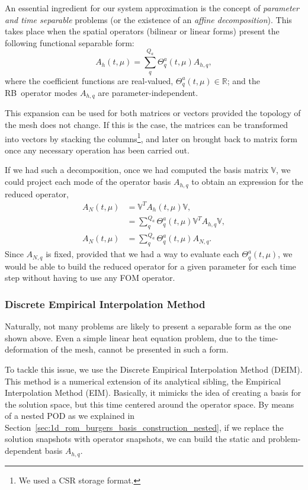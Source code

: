 \documentclass[../../thesis.tex]{subfiles}
\newcommand{\rbV}{\ensuremath{\mathbb{V}}}
\newcommand{\rbVT}{\ensuremath{\rbV^T}}
\begin{document}
An essential ingredient for our system approximation is the concept of \emph{parameter and time separable} problems 
(or the existence of an \emph{affine decomposition}).
This takes place when the spatial operators (bilinear or linear forms)
present the following functional separable form:
\begin{equation}
    \label{eq:1d_rom_burgers_separable_form_time_param}
    A_h(t, \mu) = \sum_q^{Q_a} \Theta_q^a(t, \mu) A_{h,q},
\end{equation}
where the coefficient functions are real-valued, \mbox{$\Theta_q^a(t, \mu) \in \mathbb{R}$};
and the RB operator modes $A_{h,q}$ are parameter-independent.

This expansion can be used for both matrices or vectors provided 
the topology of the mesh does not change.
If this is the case, the matrices can be transformed into vectors
by stacking the columns\footnote{We used a CSR storage format.}, 
and later on brought back to matrix form once any necessary operation has been carried out.

If we had such a decomposition, once we had computed the basis matrix \rbV, 
we could project each mode of the operator basis $A_{h, q}$ to obtain an expression for the reduced operator, 
\begin{equation}
    \begin{split}
        A_N(t, \mu) &= \rbVT A_h(t, \mu) \rbV,
        \\ 
        &= \sum_q^{Q_a} \Theta_q^a(t, \mu) \rbVT  A_{h, q} \rbV, 
        \\
        A_N(t, \mu) &= \sum_q^{Q_a} \Theta_q^a(t, \mu) A_{N,q}.
    \end{split}
\end{equation}
Since $A_{N, q}$ is fixed, provided that we had a way to evaluate each $\Theta_q^a(t, \mu)$, 
we would be able to build the reduced operator for a given parameter for each time step without having to use any FOM operator. 

\subsubsection{Discrete Empirical Interpolation Method}
Naturally, not many problems are likely to present a separable form as the one shown above.
Even a simple linear heat equation problem, due to the time-deformation of the mesh, cannot be presented in such a form. 

To tackle this issue, we use the Discrete Empirical Interpolation Method (DEIM).
This method is a numerical extension of its analytical sibling, the Empirical Interpolation Method (EIM).
Basically, it mimicks the idea of creating a basis for the solution space, but this time centered around the operator space.
By means of a nested POD as we explained in Section~\ref{sec:1d_rom_burgers_basis_construction_nested}, 
if we replace the solution snapshots with operator snapshots, 
we can build the static and problem-dependent basis $A_{h,q}$.
\end{document}
